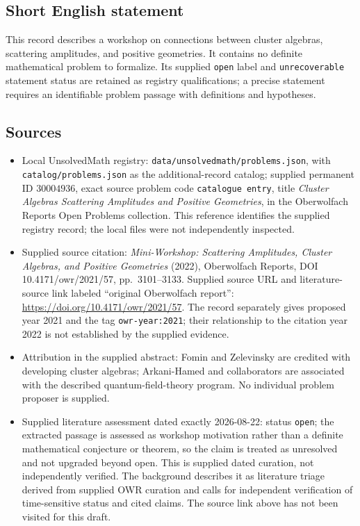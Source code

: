 \documentclass[11pt]{article}
\begin{document}
\subsection{Short English statement}
This record describes a workshop on connections between cluster algebras, scattering amplitudes, and positive geometries. It contains no definite mathematical problem to formalize. Its supplied \texttt{open} label and \texttt{unrecoverable} statement status are retained as registry qualifications; a precise statement requires an identifiable problem passage with definitions and hypotheses.
\subsection{Sources}
\begin{itemize}
\item Local UnsolvedMath registry: \texttt{data/unsolvedmath/problems.json}, with \texttt{catalog/problems.json} as the additional-record catalog; supplied permanent ID \(30004936\), exact source problem code \texttt{catalogue entry}, title \emph{Cluster Algebras Scattering Amplitudes and Positive Geometries}, in the Oberwolfach Reports Open Problems collection. This reference identifies the supplied registry record; the local files were not independently inspected.
\item Supplied source citation: \emph{Mini-Workshop: Scattering Amplitudes, Cluster Algebras, and Positive Geometries} (2022), Oberwolfach Reports, DOI 10.4171/owr/2021/57, pp.\ 3101--3133. Supplied source URL and literature-source link labeled ``original Oberwolfach report'': \url{https://doi.org/10.4171/owr/2021/57}. The record separately gives proposed year 2021 and the tag \texttt{owr-year:2021}; their relationship to the citation year 2022 is not established by the supplied evidence.
\item Attribution in the supplied abstract: Fomin and Zelevinsky are credited with developing cluster algebras; Arkani-Hamed and collaborators are associated with the described quantum-field-theory program. No individual problem proposer is supplied.
\item Supplied literature assessment dated exactly 2026-08-22: status \texttt{open}; the extracted passage is assessed as workshop motivation rather than a definite mathematical conjecture or theorem, so the claim is treated as unresolved and not upgraded beyond open. This is supplied dated curation, not independently verified. The background describes it as literature triage derived from supplied OWR curation and calls for independent verification of time-sensitive status and cited claims. The source link above has not been visited for this draft.
\end{itemize}
\end{document}

